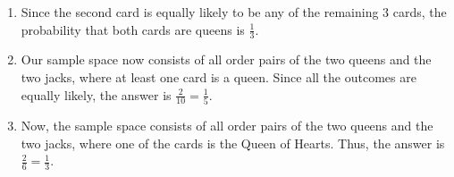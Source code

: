 \begin{enumerate}[label=(\alph*)]

\item Since the second card is equally likely to be any of the remaining $3$ cards,
the probability that both cards are queens is $\frac{1}{3}$.

\item Our sample space now consists of all order pairs of the two queens and 
the two jacks, where at least one card is a queen. Since all the outcomes are
equally likely,
the answer is $\frac{2}{10} = \frac{1}{5}$.

\item Now, the sample space consists of all order pairs of the two queens and 
the two jacks, where one of the cards is the Queen of Hearts. Thus, the answer
is $\frac{2}{6} = \frac{1}{3}$.

\end{enumerate}